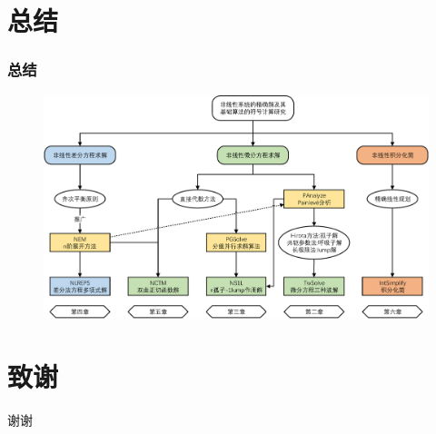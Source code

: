 \documentclass[serif]{beamer}
\begin{document}
\section{总结}
\begin{frame}
\frametitle{总结}
\begin{figure}
\centering
\includegraphics[width=\textwidth]{../paper/fig/outline.pdf} 
\end{figure}
\end{frame}

\section{致谢}
\begin{frame}
\centerline{\Huge 谢谢}
\end{frame}
\end{document}
